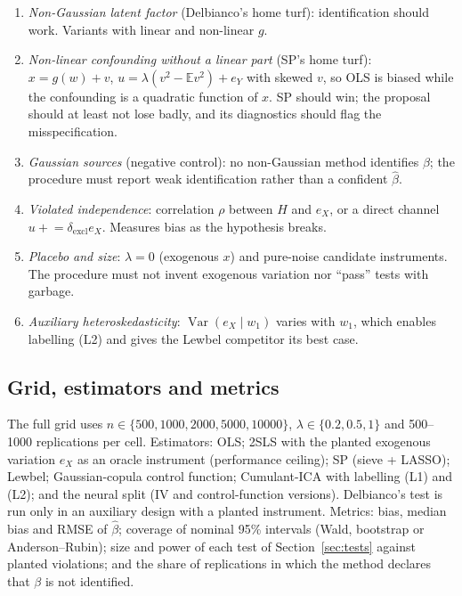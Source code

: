 \documentclass[11pt]{article}
\theoremstyle{definition}
\theoremstyle{remark}
\newcommand{\E}{\mathbb{E}}
\newcommand{\Var}{\operatorname{Var}}
\begin{document}
\begin{enumerate}[label=S\arabic*.]
  \item \emph{Non-Gaussian latent factor} (Delbianco's home turf): identification should work.
  Variants with linear and non-linear $g$.
  \item \emph{Non-linear confounding without a linear part} (SP's home turf):
  $x = g(w) + v$, $u = \lambda(v^2 - \E v^2) + e_Y$ with skewed $v$, so OLS is biased while the
  confounding is a quadratic function of $x$. SP should win; the proposal should at least not
  lose badly, and its diagnostics should flag the misspecification.
  \item \emph{Gaussian sources} (negative control): no non-Gaussian method identifies $\beta$; the
  procedure must report weak identification rather than a confident $\hat\beta$.
  \item \emph{Violated independence}: correlation $\rho$ between $H$ and $e_X$, or a direct channel
  $u \mathrel{+}= \delta_{\mathrm{excl}} e_X$. Measures bias as the hypothesis breaks.
  \item \emph{Placebo and size}: $\lambda=0$ (exogenous $x$) and pure-noise candidate instruments.
  The procedure must not invent exogenous variation nor ``pass'' tests with garbage.
  \item[Aux.] \emph{Auxiliary heteroskedasticity}: $\Var(e_X\mid w_1)$ varies with $w_1$, which
  enables labelling (L2) and gives the Lewbel competitor its best case.
\end{enumerate}

\subsection{Grid, estimators and metrics}

The full grid uses $n\in\{500,1000,2000,5000,10000\}$, $\lambda\in\{0.2,0.5,1\}$ and 500--1000
replications per cell. Estimators: OLS; 2SLS with the planted exogenous variation $e_X$ as an
oracle instrument (performance ceiling); SP (sieve + LASSO); Lewbel; Gaussian-copula control
function; Cumulant-ICA with labelling (L1) and (L2); and the neural split (IV and control-function
versions). Delbianco's test is run only in an auxiliary design with a planted instrument. Metrics:
bias, median bias and RMSE of $\hat\beta$; coverage of nominal 95\% intervals (Wald, bootstrap or
Anderson--Rubin); size and power of each test of Section~\ref{sec:tests} against planted violations;
and the share of replications in which the method declares that $\beta$ is not identified.
\end{document}
